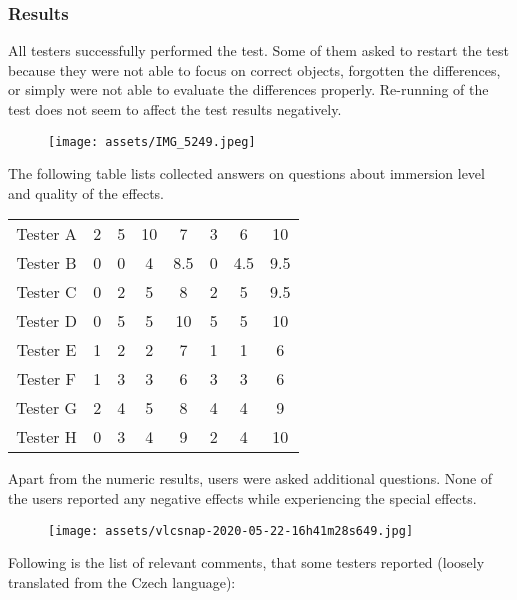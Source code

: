 \hypertarget{x-results}{\subsubsection*{Results}}
All testers successfully performed the test. Some of them asked to
restart the test because they were not able to focus on correct objects,
forgotten the differences, or simply were not able to evaluate the
differences properly. Re-running of the test does not seem to affect the
test results negatively.


\begin{figure}[h]{}
\centering\texttt{[image: assets/IMG\_5249.jpeg]}
\caption{}

\end{figure}

The following table lists collected answers on questions about immersion level and
quality of the effects.


\begin{center}
\begin{tabular}{|c|c|c|c|c|c|c|c|}
\hline
Tester A & 2 & 5 & 10 & 7 & 3 & 6 & 10 \\ 
Tester B & 0 & 0 & 4 & 8.5 & 0 & 4.5 & 9.5 \\ 
Tester C & 0 & 2 & 5 & 8 & 2 & 5 & 9.5 \\ 
Tester D & 0 & 5 & 5 & 10 & 5 & 5 & 10 \\ 
Tester E & 1 & 2 & 2 & 7 & 1 & 1 & 6 \\ 
Tester F & 1 & 3 & 3 & 6 & 3 & 3 & 6 \\ 
Tester G & 2 & 4 & 5 & 8 & 4 & 4 & 9 \\ 
Tester H & 0 & 3 & 4 & 9 & 2 & 4 & 10 \\ 
\hline
\end{tabular}
\end{center}

Apart from the numeric results, users were asked additional questions.
None of the users reported any negative effects while experiencing the special
effects.


\begin{figure}[h]{}
\centering\texttt{[image: assets/vlcsnap-2020-05-22-16h41m28s649.jpg]}
\caption{}

\end{figure}

Following is the list of relevant comments, that some testers reported
(loosely translated from the Czech language):


